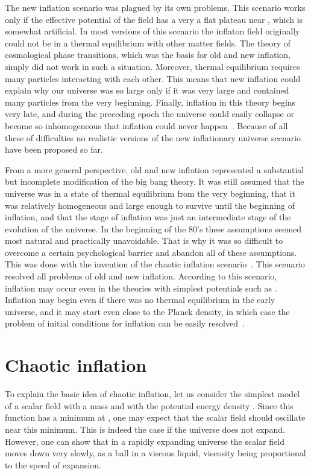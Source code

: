 \documentclass[a4paper,12pt]{article}
\begin{document}
The new inflation scenario was plagued by its own problems. This scenario
works only if the effective potential of the field \myHighlight{$\phi$}\coordHE{} has a very a
flat plateau near \coordHE{}, which  is somewhat  artificial. In most
versions of this scenario the inflaton field originally could not be in a
thermal equilibrium with other matter fields. The theory of cosmological
phase transitions, which was the basis for old and new inflation, simply
did not work in such a situation. Moreover,   thermal equilibrium
requires many particles interacting with each other. This means that new
inflation could explain why our universe was so large only if it was very
large and contained many particles from the very beginning. Finally,
inflation in this theory begins very late, and during the preceding epoch
the universe could easily collapse or become so inhomogeneous that
inflation could never happen~\cite{book}. Because of all these of difficulties
no realistic versions of the new inflationary universe   scenario have
been proposed so far.

 From a more general perspective, old and new inflation represented  a
substantial but  incomplete modification of the big bang theory. It was
still assumed that the universe was in a state of thermal equilibrium
from the very beginning, that it was relatively homogeneous and large
enough to survive until the beginning of inflation, and that the stage of
inflation was just an intermediate stage of the evolution of the
universe. In the beginning of the 80's these assumptions seemed most
natural and practically unavoidable. That is why it was so difficult to
overcome a certain psychological barrier and abandon all of these
assumptions. This was done with the invention of the chaotic inflation
scenario~\cite{Chaot}. This scenario resolved all   problems of old and
new inflation. According to this scenario, inflation may occur even in
the theories with simplest potentials such as \coordHE{}.
Inflation may begin even if there was no thermal equilibrium in the early
universe, and it may start even close to the Planck density, in which case
the problem of initial conditions for inflation can be easily resolved~\cite{book}.


\section{Chaotic inflation}

To explain the basic idea of chaotic inflation, let us consider  the
simplest model of a scalar field \myHighlight{$\phi$}\coordHE{} with a mass \coordHE{} and with the
potential energy density \coordHE{}.
Since this function has a minimum at \coordHE{},  one may expect that the
scalar field \myHighlight{$\phi$}\coordHE{} should oscillate near this minimum. This is indeed
the case if the universe does not expand. However, one can show that in a
rapidly expanding universe  the scalar field moves down very slowly, as a
ball in a viscous liquid, viscosity being proportional to the speed of
expansion.
\end{document}
